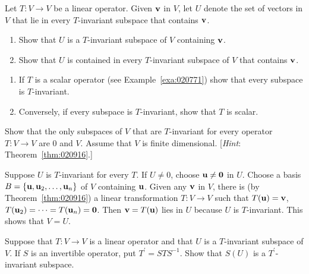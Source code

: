 \begin{multicols}{2}
\begin{ex}
Let $T : V \to V$ be a linear operator. Given $\textbf{v}$ in $V$, let $U$ denote the set of vectors in $V$ that lie in every $T$-invariant subspace that contains $\textbf{v}$.


\begin{enumerate}[label={\alph*.}]
\item Show that $U$ is a $T$-invariant subspace of $V$ containing $\textbf{v}$.

\item Show that $U$ is contained in every $T$-invariant subspace of $V$ that contains $\textbf{v}$.

\end{enumerate}
\end{ex}

\begin{ex}
\begin{enumerate}[label={\alph*.}]
\item If $T$ is a scalar operator (see Example~\ref{exa:020771}) show that every subspace is $T$-invariant.

\item Conversely, if every subspace is $T$-invariant, show that $T$ is scalar.

\end{enumerate}
\end{ex}

\begin{ex}
Show that the only subspaces of $V$ that are $T$-invariant for every operator $T : V \to V$ are $0$ and $V$. Assume that $V$ is finite dimensional. [\textit{Hint}: Theorem~\ref{thm:020916}.]

\begin{sol}
Suppose $U$ is $T$-invariant for every $T$. If $U \neq 0$, choose $\textbf{u} \neq \textbf{0}$ in $U$. Choose a basis $B = \{\textbf{u}, \textbf{u}_2, \dots, \textbf{u}_n\}$ of $V$ containing $\textbf{u}$. Given any $\textbf{v}$ in $V$, there is (by Theorem~\ref{thm:020916}) a linear transformation $T : V \to V$ such that $T(\textbf{u}) = \textbf{v}$, $T(\textbf{u}_2) = \cdots = T(\textbf{u}_n) = \textbf{0}$. Then $\textbf{v} = T(\textbf{u})$ lies in $U$ because $U$ is $T$-invariant. This shows that $V = U$.
\end{sol}
\end{ex}

\begin{ex}
Suppose that $T : V \to V$ is a linear operator and that $U$ is a $T$-invariant subspace of $V$. If $S$ is an invertible operator, put $T^{\prime} = STS^{-1}$. Show that $S(U)$ is a $T^{\prime}$-invariant subspace.
\end{ex}


\end{multicols}
